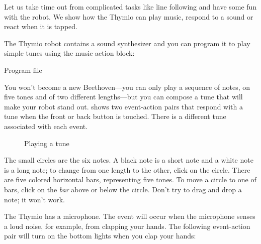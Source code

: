 
\label{ch.bells}

Let us take time out from complicated tasks like line following and
have some fun with the robot.
We show how the Thymio can play music, respond to a sound or react when it is tapped.


The Thymio robot contains a sound synthesizer and you can program it
to play simple tunes using the music action block: 

{\raggedleft \hfill Program file }

You won't become a new Beethoven---you can only play a sequence of notes,
on five tones and of two different lengths---but you can compose a
tune that will make your robot stand out.  shows
two event-action pairs that respond with a tune when the front or back
button is touched. There is a different tune associated with each event.

\begin{figure}
\begin{center}
\caption{Playing a tune}\label{fig.music}
\end{center}
\end{figure}

The small circles are the six notes.
A black note is a short note and a white note is a long note; to change from one length to the
other, click on the circle.
There are five colored horizontal bars, representing five tones.
To move a circle to one of bars, click on the \emph{bar} above or below the circle.
Don't try to drag and drop a note; it won't work.




The Thymio has a microphone. The event  will occur
when the microphone senses a loud noise, for example, from clapping your
hands. The following event-action pair will turn on the bottom lights
when you clap your hands: 


